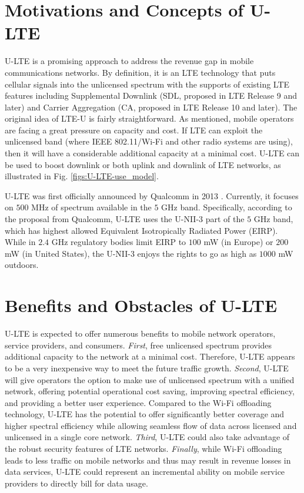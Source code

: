\section{Motivations and Concepts of U-LTE}
\label{lte-motiv}
U-LTE is a promising approach to address the revenue gap in mobile communications networks. By definition, it is an LTE technology that puts cellular signals into the unlicensed spectrum with the supports of existing LTE features including Supplemental Downlink (SDL, proposed in LTE Release 9 and later) and Carrier Aggregation (CA, proposed in LTE Release 10 and later). The original idea of LTE-U is fairly straightforward. As mentioned, mobile operators are facing a great pressure on capacity and cost. If LTE can exploit the unlicensed band (where IEEE 802.11/Wi-Fi and other radio systems are using), then it will have a considerable additional capacity at a minimal cost. U-LTE can be used to boost downlink or both uplink and downlink of LTE networks, as illustrated in Fig. \ref{figs:U-LTE-use_model}.

U-LTE was first officially announced by Qualcomm in 2013 \cite{Qualcomm-U-LTE-2013}. Currently, it focuses on $500$ MHz of spectrum available in the $5$ GHz band. Specifically, according to the proposal from Qualcomm, U-LTE uses the U-NII-3 part of the $5$ GHz band, which has highest allowed Equivalent Isotropically Radiated Power (EIRP). While in $2.4$ GHz regulatory bodies limit EIRP to $100$ mW (in Europe) or $200$ mW (in United States), the U-NII-3 enjoys the rights to go as high as $1000$ mW outdoors.

\section{Benefits and Obstacles of U-LTE}
\label{lte-ben}
U-LTE is expected to offer numerous benefits to mobile network operators, service providers, and consumers. \textit{First}, free unlicensed spectrum provides additional capacity to the network at a minimal cost. Therefore, U-LTE appears to be a very inexpensive way to meet the future traffic growth. \textit{Second}, U-LTE will give operators the option to make use of unlicensed spectrum with a unified network, offering potential operational cost saving, improving spectral efficiency, and providing a better user experience. Compared to the Wi-Fi offloading technology, U-LTE has the potential to offer significantly better coverage and higher spectral efficiency while allowing seamless flow of data across licensed and unlicensed in a single core network. \textit{Third}, U-LTE could also take advantage of the robust security features of LTE networks. \textit{Finally}, while Wi-Fi offloading leads to less traffic on mobile networks and thus may result in revenue losses in data services, U-LTE could represent an incremental ability on mobile service providers to directly bill for data usage.

